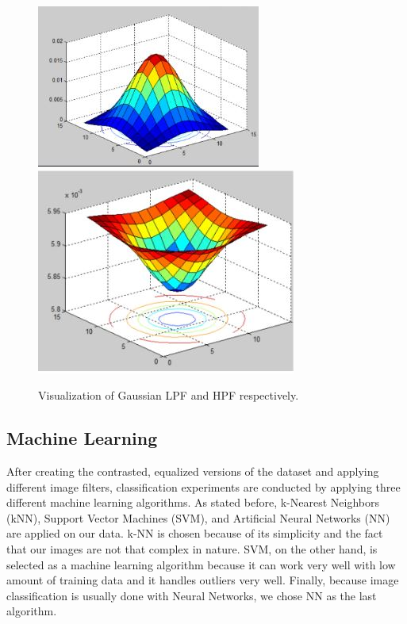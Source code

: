 \documentclass[conference]{IEEEtran}
\begin{document}
\begin{figure}[h]
\centering
\includegraphics[scale=0.4]{figures/lpf_filter.JPG}
\includegraphics[scale=0.32]{figures/hpf_filter.JPG}
\caption{Visualization of Gaussian LPF and HPF respectively.}
\end{figure}

\subsection{Machine Learning}
After creating the contrasted, equalized versions of the dataset and applying different image filters, classification experiments are conducted by applying three different machine learning algorithms. As stated before, k-Nearest Neighbors (kNN), Support Vector Machines (SVM), and Artificial Neural Networks (NN) are applied on our data. k-NN is chosen because of its simplicity and the fact that our images are not that complex in nature. SVM, on the other hand, is selected as a machine learning algorithm because it can work very well with low amount of training data and it handles outliers very well. Finally, because image classification is usually done with Neural Networks, we chose NN as the last algorithm. 
\end{document}
